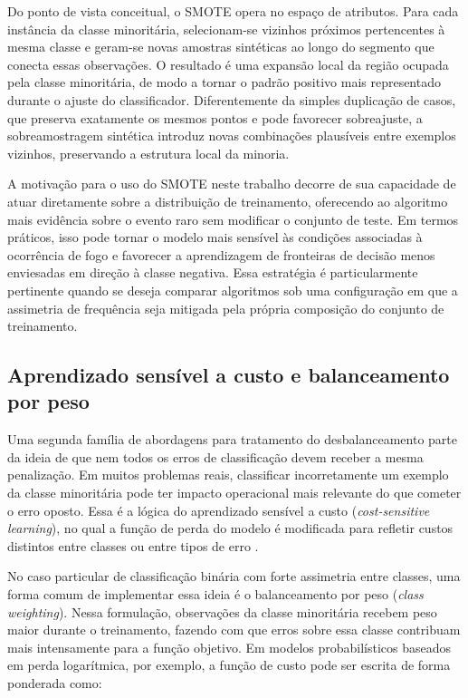 Do ponto de vista conceitual, o SMOTE opera no espaço de atributos. Para cada instância da classe minoritária, selecionam-se vizinhos próximos pertencentes à mesma classe e geram-se novas amostras sintéticas ao longo do segmento que conecta essas observações. O resultado é uma expansão local da região ocupada pela classe minoritária, de modo a tornar o padrão positivo mais representado durante o ajuste do classificador. Diferentemente da simples duplicação de casos, que preserva exatamente os mesmos pontos e pode favorecer sobreajuste, a sobreamostragem sintética introduz novas combinações plausíveis entre exemplos vizinhos, preservando a estrutura local da minoria.

A motivação para o uso do SMOTE neste trabalho decorre de sua capacidade de atuar diretamente sobre a distribuição de treinamento, oferecendo ao algoritmo mais evidência sobre o evento raro sem modificar o conjunto de teste. Em termos práticos, isso pode tornar o modelo mais sensível às condições associadas à ocorrência de fogo e favorecer a aprendizagem de fronteiras de decisão menos enviesadas em direção à classe negativa. Essa estratégia é particularmente pertinente quando se deseja comparar algoritmos sob uma configuração em que a assimetria de frequência seja mitigada pela própria composição do conjunto de treinamento.

\subsection{Aprendizado sensível a custo e balanceamento por peso}

Uma segunda família de abordagens para tratamento do desbalanceamento parte da ideia de que nem todos os erros de classificação devem receber a mesma penalização. Em muitos problemas reais, classificar incorretamente um exemplo da classe minoritária pode ter impacto operacional mais relevante do que cometer o erro oposto. Essa é a lógica do aprendizado sensível a custo (\textit{cost-sensitive learning}), no qual a função de perda do modelo é modificada para refletir custos distintos entre classes ou entre tipos de erro \cite{ling2011costsensitive}.

No caso particular de classificação binária com forte assimetria entre classes, uma forma comum de implementar essa ideia é o balanceamento por peso (\textit{class weighting}). Nessa formulação, observações da classe minoritária recebem peso maior durante o treinamento, fazendo com que erros sobre essa classe contribuam mais intensamente para a função objetivo. Em modelos probabilísticos baseados em perda logarítmica, por exemplo, a função de custo pode ser escrita de forma ponderada como:

